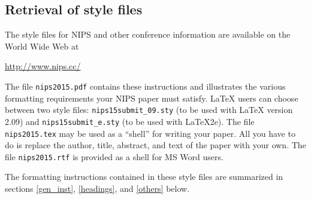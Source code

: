 \documentclass{article} %
\begin{document}



\subsection{Retrieval of style files}

The style files for NIPS and other conference information are available on the World Wide Web at
\begin{center}
   \url{http://www.nips.cc/}
\end{center}
The file \verb+nips2015.pdf+ contains these 
instructions and illustrates the
various formatting requirements your NIPS paper must satisfy. \LaTeX{}
users can choose between two style files:
\verb+nips15submit_09.sty+ (to be used with \LaTeX{} version 2.09) and
\verb+nips15submit_e.sty+ (to be used with \LaTeX{}2e). The file
\verb+nips2015.tex+ may be used as a ``shell'' for writing your paper. All you
have to do is replace the author, title, abstract, and text of the paper with
your own. The file
\verb+nips2015.rtf+ is provided as a shell for MS Word users.

The formatting instructions contained in these style files are summarized in
sections \ref{gen_inst}, \ref{headings}, and \ref{others} below.


\end{document}
